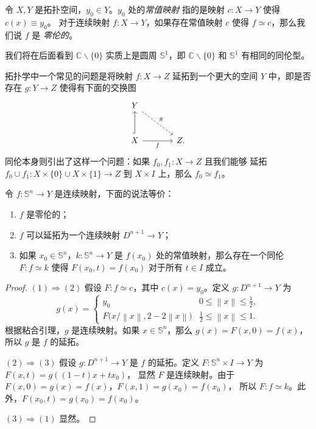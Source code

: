 \documentclass[fontset=none]{Notes}
\newcommand{\norm}[1]{\left\lVert#1\right\rVert}
\begin{document}
\begin{definition}
  令 $X,Y$ 是拓扑空间，$y_0\in Y$。$y_0$ 处的\emph{常值映射}
  指的是映射 $c:X\to Y$ 使得 $c(x)\equiv y_0$。
  对于连续映射 $f:X\to Y$，如果存在常值映射 $c$ 使得 $f\simeq c$，那么我们说 $f$ 是
  \emph{零伦的}。
\end{definition}

\begin{remark}
  我们将在后面看到 $\mathbb{C}\smallsetminus\{0\}$ 实质上是圆周
  $\mathbb{S}^1$，即 $\mathbb{C}\smallsetminus\{0\}$ 和 $\mathbb{S}^1$
  有相同的同伦型。
\end{remark}

拓扑学中一个常见的问题是将映射 $f:X\to Z$ 延拓到一个更大的空间 $Y$
中，即是否存在 $g:Y\to Z$ 使得有下面的交换图
\[
  \begin{tikzcd}[column sep=large,row sep=large]
    Y\arrow[dr,"g",dashrightarrow] & \\
    X\arrow[u,hook]\arrow[r,"f"'] & Z  .
  \end{tikzcd}
\]
同伦本身则引出了这样一个问题：如果 $f_0,f_1:X\to Z$ 且我们能够
延拓 $f_0\cup f_1:X\times\{0\}\cup X\times\{1\}\to Z$ 到
$X\times I$ 上，那么 $f_0\simeq f_1$。

\begin{theorem}\label{thm:S^n is nullhomotopic}
  令 $f:\mathbb{S}^n\to Y$ 是连续映射，下面的说法等价：
  \begin{enumerate}
    \item $f$ 是零伦的；
    \item $f$ 可以延拓为一个连续映射 $D^{n+1}\to Y$；
    \item 如果 $x_0\in \mathbb{S}^n$，$k:\mathbb{S}^n\to Y$
    是 $f(x_0)$ 处的常值映射，那么存在一个同伦 $F:f\simeq k$
    使得 $F(x_0,t)=f(x_0)$ 对于所有 $t\in I$ 成立。
  \end{enumerate}
\end{theorem}
\begin{proof}
  $(1)\Rightarrow(2)$ 假设 $F:f\simeq c$，其中 $c(x)=y_0$。定义
  $g:D^{n+1}\to Y$ 为
  \[
    g(x)=\begin{cases}
      y_0 & 0\leq \norm{x}\leq\frac{1}{2},\\
      F\bigl(x/\norm{x},2-2\norm{x}\bigr) & 
      \frac{1}{2}\leq\norm{x}\leq 1.
    \end{cases}
  \]
  根据粘合引理，$g$ 是连续映射。如果 $x\in \mathbb{S}^n$，那么
  $g(x)=F(x,0)=f(x)$，所以 $g$ 是 $f$ 的延拓。

  $(2)\Rightarrow(3)$ 假设 $g:D^{n+1}\to Y$ 是 $f$ 的延拓。定义
  $F:\mathbb{S}^{n}\times I\to Y$ 为 $F(x,t)=g((1-t)x+tx_0)$，
  显然 $F$ 是连续映射。由于 $F(x,0)=g(x)=f(x)$，$F(x,1)=g(x_0)=f(x_0)$，
  所以 $F:f\simeq k$。此外，$F(x_0,t)=g(x_0)=f(x_0)$。

  $(3)\Rightarrow (1)$ 显然。
\end{proof}
\end{document}
